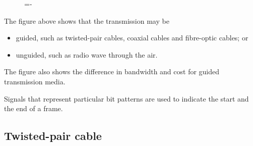 \documentclass[a4paper]{systems-software}
\begin{document}
\begin{figure}[H]
	\lineskip=-\fboxrule
\end{figure}

The figure above shows that the transmission may be
\begin{itemize}
	\item guided, such as twisted-pair cables, coaxial cables and fibre-optic cables; or
	\item unguided, such as radio wave through the air.
\end{itemize}

The figure also shows the difference in bandwidth and cost for guided transmission media.

Signals that represent particular bit patterns are used to indicate the start and the end of a frame.


\subsection*{Twisted-pair cable}
\end{document}
